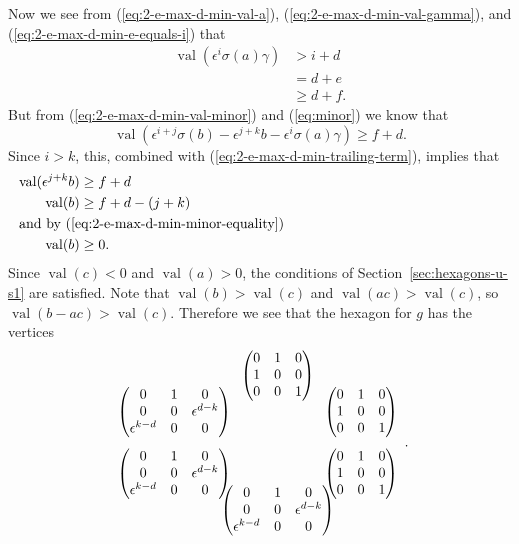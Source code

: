\documentclass{amsart}
\theoremstyle{definition}
\def\e{\epsilon}
\def\val{\mathop{\mathrm{val}}}
\def\s{\sigma}
\def\heximages#1#2#3#4#5#6{
  \heximagessqueezedcarefully{1.7em}{-1em}{#1}{#2}{#3}{#4}{#5}{#6}
}
\def\heximagessqueezedcarefully#1#2#3#4#5#6#7#8{
  \begin{array}{ccc}
    & #3 & \\[#2]
    #5 \hspace{-#1} & & \hspace{-#1} #4 \\[2em]
    #6 \hspace{-#1} & & \hspace{-#1} #7 \\[#2]
    & #8 &
  \end{array}
}
\begin{document}
  Now we see from (\ref{eq:2-e-max-d-min-val-a}),
  (\ref{eq:2-e-max-d-min-val-gamma}), and
  (\ref{eq:2-e-max-d-min-e-equals-i}) that
  \begin{align}
    \val(\e^i\s(a)\gamma) &> i + d \nonumber \\
    &= d + e \nonumber \\
    \label{eq:2-e-max-d-min-trailing-term}
    &\ge d + f.
  \end{align}
  But from (\ref{eq:2-e-max-d-min-val-minor}) and (\ref{eq:minor}) we know that
  \begin{equation*}
    \val(\e^{i+j}\s(b) - \e^{j+k}b - \e^i\s(a)\gamma) \ge f + d.
  \end{equation*}
  Since $i > k$, this, combined with
  (\ref{eq:2-e-max-d-min-trailing-term}), implies that
  \begin{align}
    \val(\e^{j+k}b) &\ge f + d \nonumber \\
    \val(b) &\ge f + d - (j + k) \\
    \noalign{\noindent and by (\ref{eq:2-e-max-d-min-minor-equality})}
    \label{eq:2-e-max-d-min-val-b}
    \val(b) &\ge 0.
  \end{align}
  Since $\val(c) < 0$ and $\val(a) > 0$, the conditions of
  Section~\ref{sec:hexagons-u-s1} are satisfied.  Note that $\val(b) > \val(c)$
  and $\val(ac) > \val(c)$, so $\val(b-ac) > \val(c)$.  Therefore we see that
  the hexagon for $g$ has the vertices
  \begin{equation*}
   \heximages
       {\begin{pmatrix}
           0 & 1 & 0 \\
           1 & 0 & 0 \\
           0 & 0 & 1
       \end{pmatrix}}
       {\begin{pmatrix}
           0 & 1 & 0 \\
           1 & 0 & 0 \\
           0 & 0 & 1
       \end{pmatrix}}
       {\begin{pmatrix}
           0 & 1 & 0 \\
           0 & 0 & \e^{d-k} \\
           \e^{k-d} & 0 & 0
       \end{pmatrix}}
       {\begin{pmatrix}
           0 & 1 & 0 \\
           0 & 0 & \e^{d-k} \\
           \e^{k-d} & 0 & 0
       \end{pmatrix}}
       {\begin{pmatrix}
           0 & 1 & 0 \\
           1 & 0 & 0 \\
           0 & 0 & 1
       \end{pmatrix}}
       {\begin{pmatrix}
           0 & 1 & 0 \\
           0 & 0 & \e^{d-k} \\
           \e^{k-d} & 0 & 0
       \end{pmatrix}}.
  \end{equation*}
\end{document}
